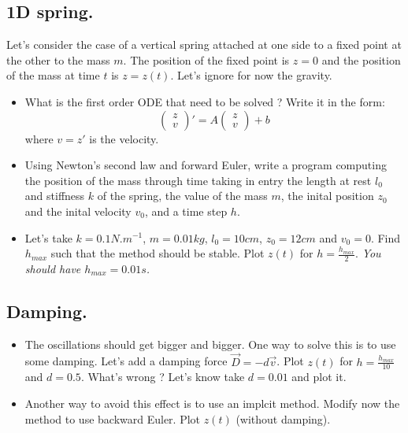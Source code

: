 \subsection{1D spring.} Let's consider the case of a vertical spring attached at one side to a fixed point at the other to the mass $m$. The position of the fixed point is $z = 0$ and the position of the mass at time $t$ is $z = z(t)$. Let's ignore for now the gravity.
\begin{itemize}
\item What is the first order ODE that need to be solved ? Write it in the form:
  $$\left( \begin{matrix} z\\ v \end{matrix} \right) ' = A \left( \begin{matrix} z\\ v \end{matrix} \right) + b$$
  where $v = z'$ is the velocity.
\end{itemize}
\hspace{1cm}
\begin{itemize}
\item Using Newton's second law and forward Euler, write a program computing the position of the mass through time taking in entry the length at rest $l_0$ and stiffness $k$ of the spring, the value of the mass $m$, the inital position $z_0$ and the inital velocity $v_0$, and a time step $h$.
\item Let's take $k = 0.1 N.m^{-1}$, $m = 0.01kg$, $l_0 = 10cm$, $z_0 = 12cm$ and $v_0 = 0$. Find $h_{max}$ such that the method should be stable. Plot $z(t)$ for $h = \frac{h_{max}}{2}$.  \textit{You should have $h_{max} = 0.01s$.}
\end{itemize}

\subsection{Damping.}
  \begin{itemize}
\item The oscillations should get bigger and bigger. One way to solve this is to use some damping. Let's add a damping force $\vec{D} = -d\vec{v}$. Plot $z(t)$ for $h = \frac{h_{max}}{10}$ and  $d = 0.5$. What's wrong ? Let's know take $d = 0.01$ and plot it.
  \item Another way to avoid this effect is to use an implcit method. Modify now the method to use backward Euler. Plot $z(t)$ (without damping).
\end{itemize}


